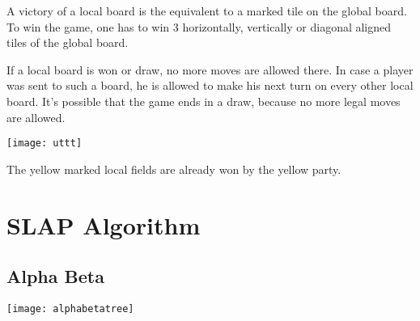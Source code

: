A victory of a local board is the equivalent to a marked tile on the global board. To win the game, one has to win 3 horizontally, vertically or diagonal aligned tiles of the global board.

If a local board is won or draw, no more moves are allowed there. In case a player was sent to such a board, he is allowed to make his next turn on every other local board. It's possible that the game ends in a draw, because  no more legal moves are allowed.

\begin{fixedpic}
	\centering
	\texttt{[image: uttt]}
\end{fixedpic}

The yellow marked local fields are already won by the yellow party.

\section{SLAP Algorithm}

\subsection{Alpha Beta}
\begin{fixedpic}
	\centering
	\texttt{[image: alphabetatree]}
\end{fixedpic}



